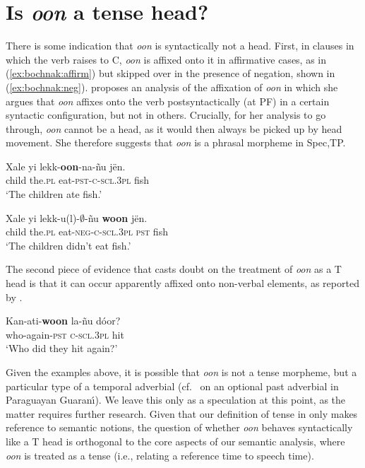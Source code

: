 \documentclass[output=paper,newtxmath,modfonts,nonflat,draftmode]{langsci/langscibook}
\begin{document}
\section{Is \textit{oon} a tense head?}\label{sec:bochnak:5}

There is some indication that \textit{oon} is syntactically not a
head. First, in clauses in which the verb raises to C, \textit{oon} is
affixed onto it in affirmative cases, as in (\ref{ex:bochnak:affirm}) but skipped over in the presence
of negation, shown in (\ref{ex:bochnak:neg}). \cite{Martinovic2015b, Martinovic2016a} proposes an
analysis of the affixation of \textit{oon} in which she argues that
\textit{oon} affixes onto
the verb postsyntactically (at PF) in a certain syntactic
configuration, but not in others. Crucially, for her analysis to go
through, \textit{oon} cannot be a head, as it would then always be
picked up by head movement. She therefore suggests that \textit{oon}
is a phrasal morpheme in Spec,TP.


  
\ea
\gll Xale yi lekk-\textbf{oon}-na-\~nu j\"en.\\
child the.\textsc{pl} eat-\textsc{pst-c-scl.3pl} fish\\
\glt `The children ate fish.'\label{ex:bochnak:affirm}
\z

\ea
\gll Xale yi lekk-{u(l)}-$\emptyset$-\~nu \textbf{woon} j\"en.\\
child the.\textsc{pl} eat-\textsc{neg-c-scl.3pl} \textsc{pst} fish\\
\glt `The children didn't eat fish.'\label{ex:bochnak:neg}
\z


The second piece of evidence that casts doubt on the treatment of 
\textit{oon} as a T head is that it can occur apparently affixed onto
non-verbal elements, as reported by \cite{torrence12clause}. 

\ea
\gll Kan-ati-\textbf{woon} la-\~nu d\'oor?\\
who-again-\textsc{pst} \textsc{c-scl.3pl} hit\\
\glt `Who did they hit again?'\hfill\citep[24]{torrence12clause}
\z

Given the examples above, it is possible that \textit{oon} is not a
tense morpheme, but a particular type of a temporal adverbial (cf.~\citealt{tonhauser06temporal} on an optional past adverbial in Paraguayan Guaran\'\i). We
leave this only as a speculation at this point, as the matter requires
further research. Given that our definition of tense in  only makes reference to semantic notions, the question of whether \textit{oon} behaves syntactically like a T head is orthogonal to the core aspects of our semantic analysis, where \textit{oon} is treated as a tense (i.e., relating a reference time to speech time).
\end{document}
